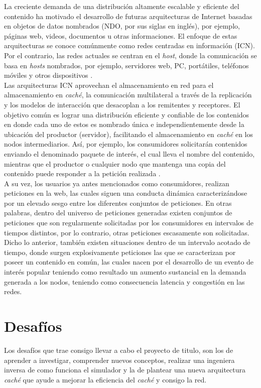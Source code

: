 \documentclass[12pt]{ociamthesis}  %
\begin{document}
La creciente demanda de una distribución altamente escalable y eficiente del contenido ha motivado el desarrollo de futuras arquitecturas de Internet basadas en objetos de datos nombrados (NDO, por sus siglas en inglés), por ejemplo, páginas web, videos, documentos u otras informaciones. El enfoque de estas arquitecturas se conoce comúnmente como redes centradas en información (ICN). Por el contrario, las redes actuales se centran en el \textit{host}, donde la comunicación se basa en \textit{hosts} nombrados, por ejemplo, servidores web, PC, portátiles, teléfonos móviles y otros dispositivos \cite{ahlgren2012survey}.\\

Las arquitecturas ICN aprovechan el almacenamiento en red para el almacenamiento en \textit{caché}, la comunicación multilateral a través de la replicación y los modelos de interacción que desacoplan a los remitentes y receptores. El objetivo común es lograr una distribución eficiente y confiable de los contenidos en donde cada uno de estos es nombrado única e independientemente desde la ubicación del productor (servidor), facilitando el almacenamiento en \textit{caché} en los nodos intermediarios. Así, por ejemplo, los consumidores solicitarán contenidos enviando el denominado paquete de interés, el cual lleva el nombre del contenido, mientras que el productor o cualquier nodo que mantenga una copia del contenido puede responder a la petición realizada \cite{ahlgren2012survey}.\\

A su vez, los usuarios ya antes mencionados como consumidores, realizan peticiones en la web, las cuales siguen una conducta dinámica caracterizándose por un elevado sesgo entre los diferentes conjuntos de peticiones. En otras palabras, dentro del universo de peticiones generadas existen conjuntos de peticiones que son regularmente solicitadas por los consumidores en intervalos de tiempos distintos, por lo contrario, otras peticiones escasamente son solicitadas. Dicho lo anterior, también existen situaciones dentro de un intervalo acotado de tiempo, donde surgen explosivamente peticiones las que se caracterizan por poseer un contenido en común, las cuales nacen por el desarrollo de un evento de interés popular teniendo como resultado un aumento sustancial en la demanda generada a los nodos, teniendo como consecuencia latencia y congestión en las redes.


\section{Desafíos}
Los desafíos que trae consigo llevar a cabo el proyecto de titulo, son los de aprender a investigar, comprender nuevos conceptos, realizar una ingeniera inversa de como funciona el simulador y la de plantear una nueva arquitectura \textit{caché} que ayude a mejorar la eficiencia del \textit{caché} y consigo la red.
\end{document}
